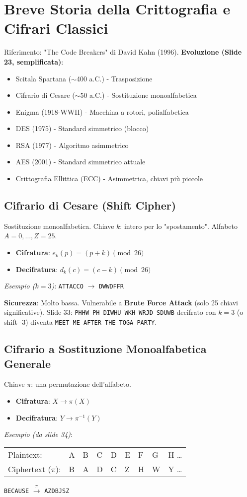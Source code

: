 \documentclass{article}
\begin{document}
\section{Breve Storia della Crittografia e Cifrari Classici}
Riferimento: "The Code Breakers" di David Kahn (1996).
\textbf{Evoluzione (Slide 23, semplificata)}:
\begin{itemize}
    \item Scitala Spartana ($\sim$400 a.C.) - Trasposizione
    \item Cifrario di Cesare ($\sim$50 a.C.) - Sostituzione monoalfabetica
    \item Enigma (1918-WWII) - Macchina a rotori, polialfabetica
    \item DES (1975) - Standard simmetrico (blocco)
    \item RSA (1977) - Algoritmo asimmetrico
    \item AES (2001) - Standard simmetrico attuale
    \item Crittografia Ellittica (ECC) - Asimmetrica, chiavi più piccole
\end{itemize}

\subsection{Cifrario di Cesare (Shift Cipher)}
Sostituzione monoalfabetica. Chiave $k$: intero per lo "spostamento". Alfabeto $A=0, \dots, Z=25$.
\begin{itemize}
    \item \textbf{Cifratura}: $e_k(p) = (p + k) \pmod{26}$
    \item \textbf{Decifratura}: $d_k(c) = (c - k) \pmod{26}$
\end{itemize}
\textit{Esempio ($k=3$)}: \texttt{ATTACCO} $\rightarrow$ \texttt{DWWDFFR}

\textbf{Sicurezza}: Molto bassa. Vulnerabile a \textbf{Brute Force Attack} (solo 25 chiavi significative).
Slide 33: \texttt{PHHW PH DIWHU WKH WRJD SDUWB} decifrato con $k=3$ (o shift -3) diventa \texttt{MEET ME AFTER THE TOGA PARTY}.

\subsection{Cifrario a Sostituzione Monoalfabetica Generale}
Chiave $\pi$: una permutazione dell'alfabeto.
\begin{itemize}
    \item \textbf{Cifratura}: $X \rightarrow \pi(X)$
    \item \textbf{Decifratura}: $Y \rightarrow \pi^{-1}(Y)$
\end{itemize}
\textit{Esempio (da slide 34)}:
\begin{tabular}{l l l l l l l l l}
    Plaintext: & A & B & C & D & E & F & G & H \dots \\
    Ciphertext ($\pi$): & B & A & D & C & Z & H & W & Y \dots
\end{tabular}
\texttt{BECAUSE} $\xrightarrow{\pi}$ \texttt{AZDBJSZ}
\end{document}
